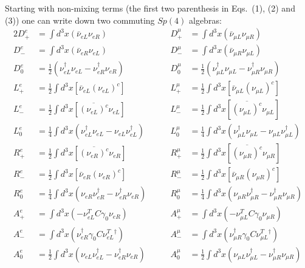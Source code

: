\documentclass[a4paper,12pt]{article}
\begin{document}
Starting with non-mixing terms (the first two 
parenthesis in Eqs.~(1), (2) and (3)) one can write down 
two commuting $Sp(4)$ algebras:
\def\intt{{\textstyle \int}}
\def\half{{\textstyle\frac{1}{2}}}
\def\fourth{{\textstyle\frac{1}{4}}}
\begin{alignat}{2}
D_{+}^{e} &=\intt d^{3}{x}( \bar{\nu}_{eL}\nu_{eR}) & \qquad
D_{+}^{\mu }&=\intt d^{3}{x}( \bar{\nu}_{\mu L}\nu_{\mu R})
\nonumber \\[0.3cm]
D_{-}^{e} &=\intt d^{3}{x}( \bar{\nu}_{eR}\nu_{eL}) & \qquad
D_{-}^{\mu }&=\intt d^{3}{x}( \bar{\nu}_{\mu R}\nu_{\mu L})
\nonumber \\[0.3cm]
D_{0}^{e}&=\half(\nu_{eL}^{\dagger }
\nu_{eL}-\nu_{eR}^{\dagger }\nu_{eR}) & \qquad D_{0}^{\mu }
&=\half(\nu_{\mu L}^{\dagger }
\nu_{\mu L}-\nu_{\mu R}^{\dagger }\nu_{\mu R})\nonumber \\[0.3cm]
L_{+}^{e}&=\half\intt d^{3}{x}[\bar{\nu}_{eL}
(\nu_{eL})^{c}]  & \qquad L_{+}^{\mu }&=\half\intt d^{3}{x}
[\bar{\nu}_{\mu L}(\nu_{\mu L})^{c}]\nonumber \\[0.3cm]
L_{-}^{e}&=\half\intt d^{3}{x}[\overline{(\nu_{eL})^{c}}
\nu_{eL}] & \qquad L_{-}^{\mu }
&=\half\intt d^{3}{x}[\overline{(\nu_{\mu L})^{c}}%
\nu_{\mu L}]\nonumber \\[0.3cm]
L_{0}^{e}&=\fourth\intt d^{3}{x}(\nu_{eL}^{\dagger }\nu_{eL}-\nu
_{eL}\nu_{eL}^{\dagger }) & \qquad L_{0}^{\mu }&=\fourth \intt d^{3}{x}(\nu
_{\mu L}^{\dagger }\nu_{\mu L}-\nu_{\mu L}\nu_{\mu L}^{\dagger })
\nonumber \\[0.3cm]
R_{+}^{e}&=\half\intt d^{3}{x}[\overline{(\nu_{eR})^{c}}
\nu_{eR}] & \qquad R_{+}^{\mu }
&=\half\intt d^{3}{x}[\overline{(\nu_{\mu R})^{c}}%
\nu_{\mu R}] \\[0.3cm]
R_{-}^{e}&=\half\intt d^{3}{x}[\bar{\nu}_{eR}(\nu_{eR})^{c}] 
& \qquad R_{-}^{\mu }
&=\half\intt d^{3}{x}[\bar{\nu}_{\mu R}(\nu_{\mu R})^{c}] 
\nonumber \\[0.3cm]
R_{0}^{e}&=\fourth \intt d^{3}{x}(\nu_{eR}\nu_{eR}^{\dagger }
-\nu_{eR}^{\dagger }\nu_{eR}) & \qquad 
R_{0}^{\mu }&=\fourth \intt d^{3}{x}(\nu_{\mu R}\nu_{\mu R}^{\dagger }
-\nu_{\mu R}^{\dagger }\nu_{\mu R}) 
\nonumber \\[0.3cm]
A_{+}^{e}&=\intt d^{3}{x}( -\nu_{eL}^{T}C\gamma_{0}\nu_{eR}) 
 & \qquad A_{+}^{\mu }
&=\intt d^{3}{x}(-\nu_{\mu L}^{T}C\gamma_{0}\nu_{\mu R})
\nonumber \\[0.3cm]
A_{-}^{e}&=\intt d^{3}{x}(\nu_{eR}^{\dagger}\gamma_{0}C\nu_{eL}^{T}
{}^{\dagger })
 & \qquad 
A_{-}^{\mu }&=\intt d^{3}{x}(\nu_{\mu R}^{\dagger }
\gamma_{0}C\nu_{\mu L}^{T}{}^{\dagger })\nonumber \\[0.3cm]
A_{0}^{e}&=\half\intt d^{3}{x}(\nu_{eL}\nu_{eL}^{\dagger }
-\nu_{eR}^{\dagger }\nu_{eR}) & \qquad A_{0}^{\mu }
&=\half\intt d^{3}{x}(\nu_{\mu L}\nu_{\mu L}^{\dagger }
-\nu_{\mu R}^{\dagger }\nu_{\mu R}) \nonumber
\end{alignat}
\end{document}
